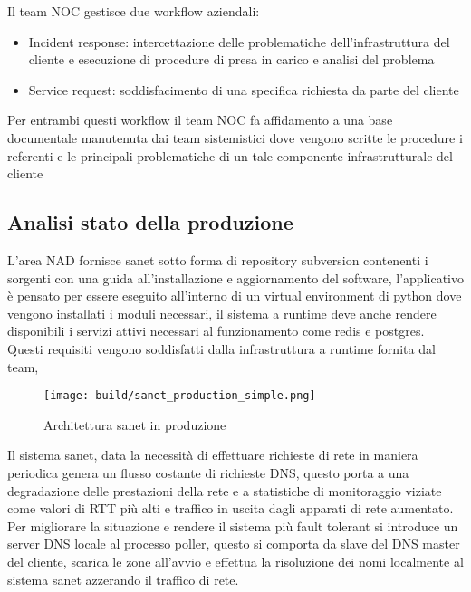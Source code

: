 
Il team NOC gestisce due workflow aziendali:

\begin{itemize}
  \item{Incident response: intercettazione delle problematiche dell'infrastruttura del cliente e esecuzione di procedure di presa in carico e analisi del problema}
  \item{Service request: soddisfacimento di una specifica richiesta da parte del cliente}
\end{itemize}

Per entrambi questi workflow il team NOC fa affidamento a una base documentale manutenuta dai team sistemistici dove vengono scritte le procedure i referenti e le principali problematiche di un tale componente infrastrutturale del cliente

\newpage
\subsection{Analisi stato della produzione}

L'area NAD fornisce sanet sotto forma di repository subversion contenenti i sorgenti con una guida all'installazione e aggiornamento del software, l'applicativo è pensato per essere eseguito all'interno di un virtual environment di python dove vengono installati i moduli necessari, il sistema a runtime deve anche rendere disponibili i servizi attivi necessari al funzionamento come redis e postgres. Questi requisiti vengono soddisfatti dalla infrastruttura a runtime fornita dal team,

\begin{figure}[H]
    \centering
    \texttt{[image: build/sanet\_production\_simple.png]}
    \caption{Architettura sanet in produzione}
    \label{fig:enter-label}
\end{figure}

Il sistema sanet, data la necessità di effettuare richieste di rete in maniera periodica genera un flusso costante di richieste DNS, questo porta a una degradazione delle prestazioni della rete e a statistiche di monitoraggio viziate come valori di RTT più alti e traffico in uscita dagli apparati di rete aumentato. Per migliorare la situazione e rendere il sistema più fault tolerant si introduce un server DNS locale al processo poller, questo si comporta da slave del DNS master del cliente, scarica le zone all'avvio e effettua la risoluzione dei nomi localmente al sistema sanet azzerando il traffico di rete.


